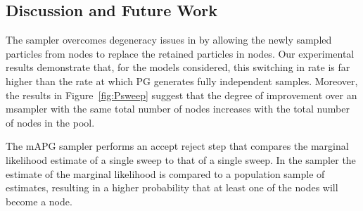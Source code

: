 
\subsection{Discussion and Future Work}
\label{sec:discussion}

The \ipmcmc sampler overcomes degeneracy issues in \pg by allowing the newly sampled particles from \smc nodes to replace the retained particles in \csmc nodes. Our experimental results demonstrate that, for the models considered, this switching in rate is far higher than the rate at which PG generates fully independent samples. Moreover, the results in Figure~\ref{fig:Psweep} suggest that the degree of improvement over an m\pg sampler with the same total number of nodes increases with the total number of nodes in the pool. 

The mAPG sampler performs an accept reject step that compares the marginal likelihood estimate of a single \csmc sweep to that of a single \smc sweep. In the \ipmcmc sampler the \csmc estimate of the marginal likelihood is compared to a population sample of \smc estimates, resulting in a higher probability that at least one of the \smc nodes will become a \csmc node.




